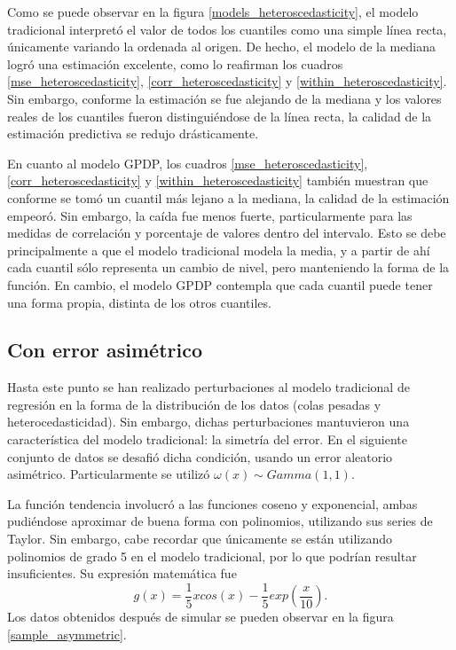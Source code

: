 Como se puede observar en la figura \ref{models_heteroscedasticity}, el modelo tradicional interpret\'o el valor de todos los cuantiles como una simple l\'inea recta, \'unicamente variando la ordenada al origen. De hecho, el modelo de la mediana logr\'o una estimaci\'on excelente, como lo reafirman los cuadros \ref{mse_heteroscedasticity}, \ref{corr_heteroscedasticity} y \ref{within_heteroscedasticity}. Sin embargo, conforme la estimaci\'on se fue alejando de la mediana y los valores reales de los cuantiles fueron distingui\'endose de la l\'inea recta, la calidad de la estimaci\'on predictiva se redujo dr\'asticamente.

En cuanto al modelo GPDP, los cuadros \ref{mse_heteroscedasticity}, \ref{corr_heteroscedasticity} y \ref{within_heteroscedasticity} tambi\'en muestran que conforme se tom\'o un cuantil m\'as lejano a la mediana, la calidad de la estimaci\'on empeor\'o. Sin embargo, la ca\'ida fue menos fuerte, particularmente para las medidas de correlaci\'on y porcentaje de valores dentro del intervalo. Esto se debe principalmente a que el modelo tradicional modela la media, y a partir de ah\'i cada cuantil s\'olo representa un cambio de nivel, pero manteniendo la forma de la funci\'on. En cambio, el modelo GPDP contempla que cada cuantil puede tener una forma propia, distinta de los otros cuantiles.

\subsection{Con error asim\'etrico}

Hasta este punto se han realizado perturbaciones al modelo tradicional de regresi\'on en la forma de la distribuci\'on de los datos (colas pesadas y heterocedasticidad). Sin embargo, dichas perturbaciones mantuvieron una caracter\'istica del modelo tradicional: la simetr\'ia del error. En el siguiente conjunto de datos se desafi\'o dicha condici\'on, usando un error aleatorio asim\'etrico. Particularmente se utiliz\'o $\omega(x) \sim Gamma(1,1)$.

La funci\'on tendencia involucr\'o a las funciones coseno y exponencial, ambas pudi\'endose aproximar de buena forma con polinomios, utilizando sus series de Taylor. Sin embargo, cabe recordar que \'unicamente se est\'an utilizando polinomios de grado 5 en el modelo tradicional, por lo que podr\'ian resultar insuficientes. Su expresi\'on matem\'atica fue
\begin{equation*}
    g(x) = \frac{1}{5} x cos(x) - \frac{1}{5}exp\left(\frac{x}{10}\right).
\end{equation*}
Los datos obtenidos despu\'es de simular se pueden observar en la figura \ref{sample_asymmetric}.

